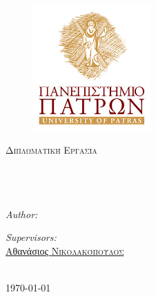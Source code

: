 \documentclass[12pt, english, singlespacing, parskip, headsepline]{MastersDoctoralThesis}
\author{Γεώργιος \textsc{Παπανικολάου}}
\begin{document}
\frontmatter
\pagestyle{plain}

\begin{titlepage}
\begin{center}
\vspace{3 mm} %
\begin{figure}[H]
\centering
\includegraphics[width=0.4\textwidth]{Upatras.jpg}
\end{figure}

\textsc{\Large Διπλωματική Εργασία}\\[0.5cm]

\HRule \\[0.4cm] %
{\LARGE \bfseries \ttitle}\\[0.4cm] 
\HRule \\[1.5cm] %
 
\begin{minipage}{0.4\textwidth}
\begin{flushleft} \normalsize
\emph{Author:}\\
\href{http://www.github.com/papanikge}{\authorname}
\end{flushleft}
\end{minipage}
\begin{minipage}{0.4\textwidth}
\begin{flushright} \normalsize
\emph{Supervisors:} \\
\href{http://athos.cti.gr/garofalakis/}{\supname}
\href{http://athos.cti.gr/nikolako/}{Αθανάσιος \textsc{Νικολακόπουλος}}
\end{flushright}
\end{minipage}\\[3cm]
 
{\large \today}\\[4cm]
 
\vfill
\end{center}
\end{titlepage}

\end{document}
